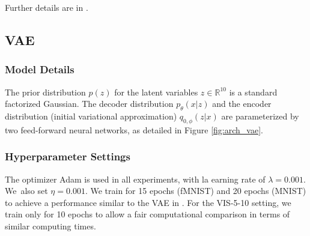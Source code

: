 Further details are in \cite{westharrison}.
\iffalse
\subsubsection{Model Details} The definition of the HMM and the DLM can be found in Figures \ref{fig:hmm} and \ref{fig:dlm}, respectively.

\begin{figure}[!htp]
\centering
\RecustomVerbatimEnvironment{Verbatim}{BVerbatim}{}
\inputminted[fontsize=\scriptsize]{python}{./hmm.tex}
\caption{Model architecture for the HMM.}
\label{fig:hmm}
\end{figure}

\begin{figure}[!htp]
\centering
\RecustomVerbatimEnvironment{Verbatim}{BVerbatim}{}
\inputminted[fontsize=\scriptsize]{python}{./dlm.tex}
\caption{Model architecture for the DLM.}
\label{fig:dlm}
\end{figure}
\fi

\subsection{VAE}

\subsubsection{Model Details}

The prior distribution $p(z)$ for the latent variables $z \in \mathbb{R}^{10}$ is a standard factorized Gaussian. The decoder distribution $p_\theta(x|z)$ and the encoder distribution (initial variational approximation) $q_{0,\phi}(z|x)$ are parameterized by two feed-forward neural networks, as 
detailed in Figure \ref{fig:arch_vae}.



\subsubsection{Hyperparameter Settings}
The optimizer Adam is used in all experiments, with 
la earning rate of $\lambda=0.001$. We~also set $\eta = 0.001$. We train for 15 epochs (fMNIST) and 20 epochs (MNIST) to achieve a performance 
similar to the VAE in \cite{pmlr-v89-titsias19a}. For the VIS-5-10 setting, we train only for 10 epochs to allow a fair computational comparison in terms of similar computing times.


